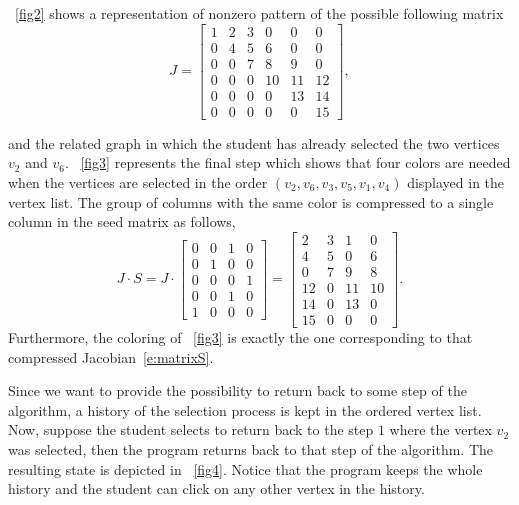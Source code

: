 \documentclass[12pt, oneside]{book}
\begin{document}
\figurename~\ref{fig2} shows a representation of nonzero pattern of the possible following matrix 
\begin{equation}
\label{e:matrixJ}
J =
 \begin{bmatrix}
 1  & 2 & 3 & 0 & 0 & 0 \\
 0  & 4 & 5 & 6 & 0 & 0 \\
 0  & 0 & 7 & 8 & 9 & 0\\
 0  & 0 & 0 & 10 & 11 & 12\\
 0  & 0 & 0 & 0 & 13  & 14  \\
 0  & 0 & 0 & 0 & 0 & 15
 \end{bmatrix},
\end{equation} 

and the related graph in which the student has already selected the two vertices $v_2$ and $v_6$. \figurename~\ref{fig3} represents the final step which shows that four colors are needed when the vertices are selected in the order $(v_2, v_6, v_3, v_5, v_1, v_4)$ displayed in the vertex list. The group of columns with the same color is compressed to a single column in the seed matrix as follows,
\begin{equation}
\label{e:matrixS}
J \cdot S =
J \cdot
 \begin{bmatrix}
 0  & 0 & 1 & 0 \\
 0  & 1 & 0 & 0 \\
 0  & 0 & 0 & 1 \\
 0  & 0 & 1 & 0 \\
 1  & 0 & 0 & 0
 \end{bmatrix}
=
 \begin{bmatrix}
 2  & 3 & 1  & 0 \\
 4  & 5 & 0  & 6 \\
 0  & 7 & 9  & 8 \\
 12 & 0 & 11 & 10\\
 14 & 0 & 13 & 0 \\
 15 & 0 & 0  & 0
 \end{bmatrix}.
\end{equation}
Furthermore, the coloring of \figurename~\ref{fig3} is exactly the one corresponding to that compressed Jacobian~\eqref{e:matrixS}.

Since we want to provide the possibility to return back to some step of the algorithm, a history of the selection process is kept in the ordered vertex list. Now, suppose the student selects to return back to the step $1$ where the vertex $v_2$ was selected, then the program returns back to that step of the algorithm. The resulting state is depicted in \figurename~\ref{fig4}. Notice that the program keeps the whole history and the student can click on any other vertex in the history.
\end{document}
